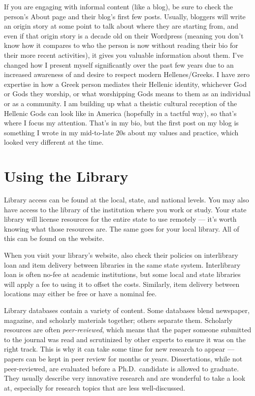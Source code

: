 \documentclass[
]{book}
\begin{document}
If you are engaging with informal content (like a blog), be sure to check the person's About page and their blog's first few posts. Usually, bloggers will write an origin story at some point to talk about where they are starting from, and even if that origin story is a decade old on their Wordpress (meaning you don't know how it compares to who the person is now without reading their bio for their more recent activities), it gives you valuable information about them. I've changed how I present myself significantly over the past few years due to an increased awareness of and desire to respect modern Hellenes/Greeks. I have zero expertise in how a Greek person mediates their Hellenic identity, whichever God or Gods they worship, or what worshipping Gods means to them as an individual or as a community. I am building up what a theistic cultural reception of the Hellenic Gods can look like in America (hopefully in a tactful way), so that's where I focus my attention. That's in my bio, but the first post on my blog is something I wrote in my mid-to-late 20s about my values and practice, which looked very different at the time.

\hypertarget{using-the-library}{%
\section{Using the Library}\label{using-the-library}}

Library access can be found at the local, state, and national levels. You may also have access to the library of the institution where you work or study. Your state library will license resources for the entire state to use remotely --- it's worth knowing what those resources are. The same goes for your local library. All of this can be found on the website.

When you visit your library's website, also check their policies on interlibrary loan and item delivery between libraries in the same state system. Interlibrary loan is often no-fee at academic institutions, but some local and state libraries will apply a fee to using it to offset the costs. Similarly, item delivery between locations may either be free or have a nominal fee.

Library databases contain a variety of content. Some databases blend newspaper, magazine, and scholarly materials together; others separate them. Scholarly resources are often \emph{peer-reviewed}, which means that the paper someone submitted to the journal was read and scrutinized by other experts to ensure it was on the right track. This is why it can take some time for new research to appear --- papers can be kept in peer review for months or years. Dissertations, while not peer-reviewed, are evaluated before a Ph.D.~candidate is allowed to graduate. They usually describe very innovative research and are wonderful to take a look at, especially for research topics that are less well-discussed.
\end{document}
